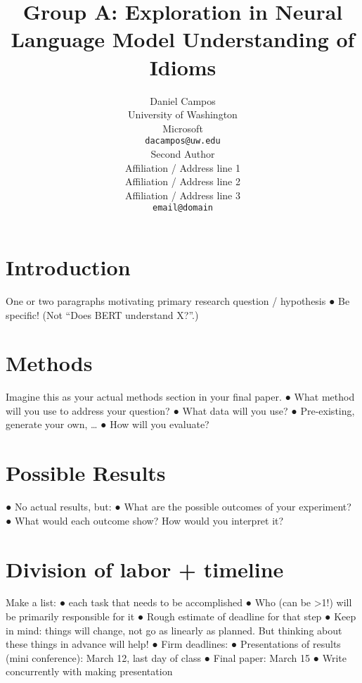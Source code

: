 \documentclass[11pt,a4paper]{article}
\title{Group A: Exploration in  Neural Language Model Understanding of Idioms}
\author{Daniel Campos \\
  University of Washington  \\
  Microsoft \\
  \texttt{dacampos@uw.edu} \\\And
  Second Author \\
  Affiliation / Address line 1 \\
  Affiliation / Address line 2 \\
  Affiliation / Address line 3 \\
  \texttt{email@domain} \\}
\date{}
\begin{document}
\maketitle
\section{Introduction}
One or two paragraphs motivating primary research question / hypothesis
● Be specific! (Not “Does BERT understand X?”.)
\section{Methods}
Imagine this as your actual methods section in your final paper.
● What method will you use to address your question?
● What data will you use?
● Pre-existing, generate your own, …
● How will you evaluate?
\section{Possible Results}
● No actual results, but:
● What are the possible outcomes of your experiment?
● What would each outcome show? How would you interpret it?
\section{Division of labor + timeline}
Make a list:
● each task that needs to be accomplished
● Who (can be >1!) will be primarily responsible for it
● Rough estimate of deadline for that step
● Keep in mind: things will change, not go as linearly as planned. But thinking
about these things in advance will help!
● Firm deadlines:
● Presentations of results (mini conference): March 12, last day of class
● Final paper: March 15
● Write concurrently with making presentation


\end{document}
